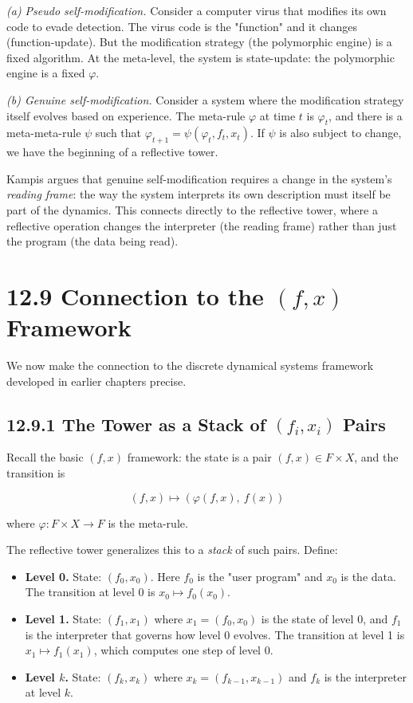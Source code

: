 \begin{example}

\textit{(a) Pseudo self-modification.} Consider a computer virus that modifies its own code to evade detection. The virus code is the "function" and it changes (function-update). But the modification strategy (the polymorphic engine) is a fixed algorithm. At the meta-level, the system is state-update: the polymorphic engine is a fixed $\varphi$.

\textit{(b) Genuine self-modification.} Consider a system where the modification strategy itself evolves based on experience. The meta-rule $\varphi$ at time $t$ is $\varphi_t$, and there is a meta-meta-rule $\psi$ such that $\varphi_{t+1} = \psi(\varphi_t, f_t, x_t)$. If $\psi$ is also subject to change, we have the beginning of a reflective tower.

Kampis argues that genuine self-modification requires a change in the system's \textit{reading frame}: the way the system interprets its own description must itself be part of the dynamics. This connects directly to the reflective tower, where a reflective operation changes the interpreter (the reading frame) rather than just the program (the data being read).
\end{example}

\section{12.9 Connection to the $(f, x)$ Framework}

We now make the connection to the discrete dynamical systems framework developed in earlier chapters precise.

\subsection{12.9.1 The Tower as a Stack of $(f_i, x_i)$ Pairs}

Recall the basic $(f, x)$ framework: the state is a pair $(f, x) \in F \times X$, and the transition is

\[
(f, x) \longmapsto (\varphi(f, x),\ f(x))
\]

where $\varphi: F \times X \to F$ is the meta-rule.

The reflective tower generalizes this to a \textit{stack} of such pairs. Define:

\begin{itemize}
  \item \textbf{Level 0.} State: $(f_0, x_0)$. Here $f_0$ is the "user program" and $x_0$ is the data. The transition at level 0 is $x_0 \mapsto f_0(x_0)$.
  \item \textbf{Level 1.} State: $(f_1, x_1)$ where $x_1 = (f_0, x_0)$ is the state of level 0, and $f_1$ is the interpreter that governs how level 0 evolves. The transition at level 1 is $x_1 \mapsto f_1(x_1)$, which computes one step of level 0.
  \item \textbf{Level $k$.} State: $(f_k, x_k)$ where $x_k = (f_{k-1}, x_{k-1})$ and $f_k$ is the interpreter at level $k$.
\end{itemize}


